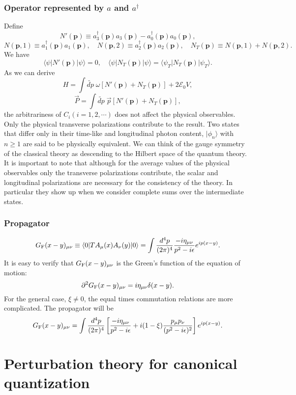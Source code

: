 \subsubsection{Operator represented by $a$ and $a^{\dagger}$}
Define
\[N'(\bm{p}) \equiv a^{\dagger}_{3}(\bm{p})a_{3}(\bm{p})-a^{\dagger}_{0}(\bm{p})a_{0}(\bm{p}),\]
\[N(\bm{p},1) \equiv a^{\dagger}_{1}(\bm{p}) a_{1}(\bm{p}) , \quad N(\bm{p},2) \equiv a^{\dagger}_{2}(\bm{p}) a_{2}(\bm{p}) , \quad N_T(\bm{p}) \equiv N(\bm{p},1) + N(\bm{p},2).\]
We have
\[\langle \psi | N'(\bm{p}) | \psi\rangle = 0 , \quad \langle \psi | N_T(\bm{p}) | \psi\rangle = \langle \psi_T | N_T(\bm{p}) | \psi_T\rangle.\]
As we can derive
\[ H = \int \widetilde{dp} \; \omega [N'(\bm{p}) + N_T(\bm{p})] + 2\mathcal{E}_0V,\]
\[ \vec{P} = \int \widetilde{dp} \; \vec{p} [N'(\bm{p}) + N_T(\bm{p})],\]
the arbitrariness of $C_i(i=1,2,\cdots)$ does not affect the physical observables. Only the physical transverse polarizations
contribute to the result. Two states that differ only in their time-like and longitudinal photon content, $|\phi_n\rangle$ with $n \geq 1$ are said to be physically equivalent. We can think of the gauge symmetry of the classical theory as descending to the Hilbert space of the quantum theory.
It is important to note that although for the average values of the physical observables only the transverse polarizations contribute, the scalar and longitudinal polarizations are necessary for the consistency of the theory. In particular they show up when we consider complete sums over the intermediate states.

\subsubsection{Propagator}
\[G_{\rm F}(x-y)_{\mu\nu} \equiv \langle 0 |T A_{\mu}(x) A_{\nu}(y) | 0 \rangle = \int \frac{d^4p}{(2\pi)^4} \frac{-i\eta_{\mu\nu}}{p^2-i\epsilon}  e^{ip(x-y)}.\]
It is easy to verify that $G_{\rm F}(x-y)_{\mu\nu}$ is the Green's function of the equation of motion:
\[\partial^2 G_{\rm F}(x-y)_{\mu\nu} = i\eta_{\mu\nu}\delta(x-y).\]
For the general case, $\xi \neq 0$, the equal times commutation relations are more complicated. The propagator will be
\[G_{\rm F}(x-y)_{\mu\nu}  = \int \frac{d^4p}{(2\pi)^4} \left[\frac{-i\eta_{\mu\nu}}{p^2-i\epsilon} + i(1-\xi)\frac{p_{\mu}p_{\nu}}{(p^2-i\epsilon)^2}\right] e^{ip(x-y)}.\]

\section{Perturbation theory for canonical quantization}
